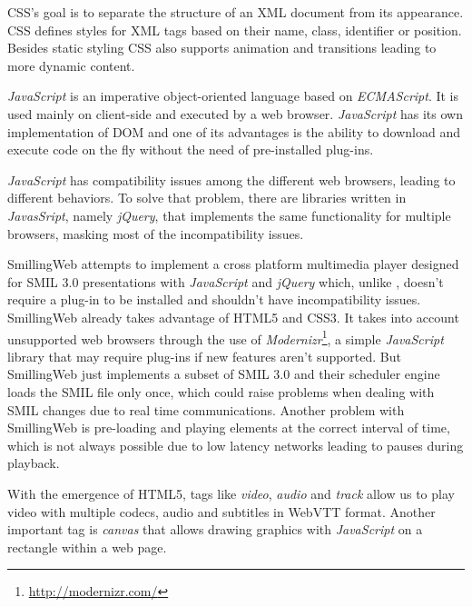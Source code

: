   \ac{CSS}'s goal is to separate the structure of an \ac{XML} document from its appearance. \ac{CSS} defines styles for \ac{XML} tags based on their name, class, identifier or position.
  Besides static styling \ac{CSS} also supports animation and transitions leading to more dynamic content.

  \emph{JavaScript} is an imperative object-oriented language based on \emph{ECMAScript}. It is used mainly on client-side and executed by a web browser. \emph{JavaScript} has its own implementation of \ac{DOM} and one of its advantages is the ability to download and execute code on the fly without the need of pre-installed plug-ins.

  \emph{JavaScript} has compatibility issues among the different web browsers, leading to different behaviors. To solve that problem, there are libraries written in \emph{JavasSript}, namely \emph{jQuery}, that implements the same functionality for multiple browsers, masking most of the incompatibility issues.

  SmillingWeb \cite{smillingweb} attempts to implement a cross platform multimedia player designed for \ac{SMIL} 3.0 presentations with \emph{JavaScript} and \emph{jQuery} which, unlike \cite{ambulant}, doesn't require a plug-in to be installed and shouldn't have incompatibility issues. 
  SmillingWeb already takes advantage of \ac{HTML}5 and \ac{CSS}3.
  It takes into account unsupported web browsers through the use of \emph{Modernizr}\footnote{\url{http://modernizr.com/}}, a simple \emph{JavaScript} library that may require plug-ins if new features aren't supported.  
  But SmillingWeb just implements a subset of \ac{SMIL} 3.0 and their scheduler engine loads the \ac{SMIL} file only once, which could raise problems when dealing with \ac{SMIL} changes due to real time communications.
  Another problem with SmillingWeb is pre-loading and playing elements at the correct interval of time, which is not always possible due to low latency networks leading to  pauses during playback.
  
  With the emergence of \ac{HTML}5, tags like \emph{video}, \emph{audio} and \emph{track} allow us to play video with multiple codecs, audio and subtitles in \ac{WebVTT} format. Another important tag is \emph{canvas} that allows drawing graphics with \emph{JavaScript} on a rectangle within a web page.

